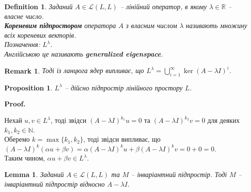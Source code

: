 \documentclass[a4paper, 10pt]{article}
\makeatletter
\theoremstyle{theoremdd}
\newtheorem{definition}[theorem]{Definition}
\newtheorem{proposition}[theorem]{Proposition}
\newtheorem{remark}[theorem]{Remark}
\newtheorem{lemma}[theorem]{Lemma}
\renewenvironment{proof}[1][Proof.\\]{\par
\pushQED{\hfill \qed}%
\normalfont \topsep6\p@\@plus6\p@\relax
\trivlist
\item\relax
{\bfseries
#1\@addpunct{.}}\hspace\labelsep\ignorespaces
}{%
\popQED\endtrivlist\@endpefalse
}
\makeatother
\begin{document}
\begin{definition}
Заданий $A \in \mathcal{L}(L,L)$ -- лінійний оператор, в якому $\lambda \in \mathbb{R}$ -- власне число.\\
\textbf{Кореневим підпростором} оператора $A$ з власним числом $\lambda$ називають множину всіх кореневих векторів.\\
Позначення: $L^\lambda$.\\
Англійською це називають \textbf{generalized eigenspace}.
\end{definition}

\begin{remark}
Тоді із ланцюга ядер випливає, що $L^\lambda = \displaystyle\bigcup_{i=1}^\infty \ker (A-\lambda I)^i$.
\end{remark}

\begin{proposition}
$L^\lambda$ -- дійсно підпростір лінійного простору $L$.
\end{proposition}

\begin{proof}
Нехай $u,v \in L^\lambda$, тоді звідси $(A-\lambda I)^{k_1}u = 0$ та $(A-\lambda I)^{k_2}v = 0$ для деяких $k_1,k_2 \in \mathbb{N}$.\\
Оберемо $k = \max \{k_1,k_2\}$, тоді звідси випливає, що\\
$(A-\lambda I)^k (\alpha u + \beta v) = 
\alpha (A-\lambda I)^k u + \beta (A-\lambda I)^k v = 0 + 0 = 0$.\\
Таким чином, $\alpha u + \beta v \in L^\lambda$.
\end{proof}

\iffalse
\begin{proposition}
Задано $A: L \to L$ - лінійний оператор та $\dim L = n$. Тоді\\
$\{0\} \subset \underset{=L_\lambda}{\ker (A-\lambda I)} \subset \ker (A-\lambda I)^2 \subset \dots \subset \underset{=L^\lambda}{\ker (A-\lambda I)^n}$.\\
І далі $\ker (A-\lambda I)^n = \ker(A-\lambda I)^{n+1} = \ker(A-\lambda I)^{n+2} = \dots$.
\end{proposition}

\begin{proof}
\textit{Не до кінця зрозумів.}
\end{proof}
\fi

\begin{lemma}
Заданий $A \in \mathcal{L}(L,L)$ та $M$ -- інваріантний підпростір. Тоді $M$ -- інваріантний підпростір відносно $A-\lambda I$.
\end{lemma}
\end{document}
